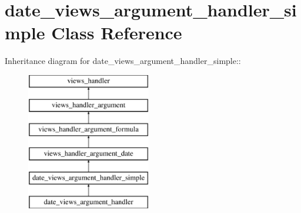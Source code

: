 \hypertarget{classdate__views__argument__handler__simple}{
\section{date\_\-views\_\-argument\_\-handler\_\-simple Class Reference}
\label{classdate__views__argument__handler__simple}
}
Inheritance diagram for date\_\-views\_\-argument\_\-handler\_\-simple::\begin{figure}[H]
\begin{center}
\leavevmode
\includegraphics[height=6cm]{classdate__views__argument__handler__simple}
\end{center}
\end{figure}

